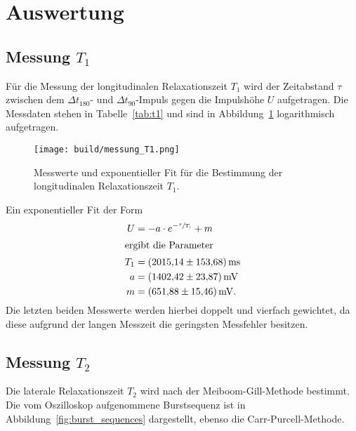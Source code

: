 \section{Auswertung}%
\label{sec:auswertung}

\subsection{Messung \texorpdfstring{$T_1$}{T1}}%
\label{sub:messung_t_1_}

Für die Messung der longitudinalen Relaxationszeit $T_1$ wird der Zeitabstand
$\tau$ zwischen dem $\Delta t_{180}$- und $\Delta t_{90}$-Impuls
gegen die Impulshöhe $U$ aufgetragen.
Die Messdaten stehen in Tabelle~\ref{tab:t1} und sind in Abbildung~\ref{fig:messung_T1}
logarithmisch aufgetragen.

\begin{table}[ht]
  \centering
  \caption{%
    Messwerte für die Bestimmung der longitudinalen Relaxationszeit $T_1$.%
  }%
  \label{tab:t1}
  
\end{table}

\begin{figure}[ht]
  \centering
  \texttt{[image: build/messung\_T1.png]}
  \caption{%
    Messwerte und exponentieller Fit für die Bestimmung der longitudinalen Relaxationszeit $T_1$.%
  }%
  \label{fig:messung_T1}
\end{figure}

Ein exponentieller Fit der Form
\begin{align}
  \nonumber U &= -a \cdot e^{-\sfrac{\tau}{T_1}} + m \\
  \intertext{ergibt die Parameter}
  \label{eq:t1} T_1 &= \SI{2015.14 \pm 153.68}{\milli\second} \\
  \nonumber a &= \SI{1402.42 \pm 23.87}{\milli\volt} \\
  \nonumber m &= \SI{651.88 \pm 15.46}{\milli\volt}.
\end{align}
Die letzten beiden Messwerte werden hierbei doppelt und vierfach gewichtet,
da diese aufgrund der langen Messzeit die geringsten Messfehler besitzen.

\subsection{Messung \texorpdfstring{$T_2$}{T2}}%
\label{sub:messung_t_2_}

Die laterale Relaxationszeit $T_2$ wird nach der Meiboom-Gill-Methode bestimmt.
Die vom Oszilloskop aufgenommene Burstsequenz ist in Abbildung~\ref{fig:burst_sequences}
dargestellt, ebenso die Carr-Purcell-Methode.

